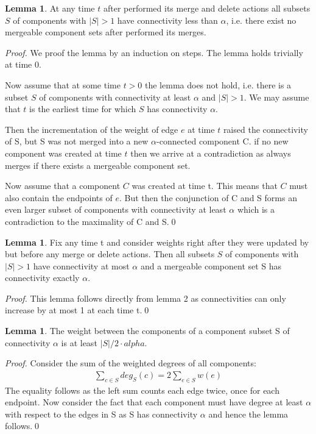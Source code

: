 \documentclass[a4paper,xcolor=dvipsnames, tikz, 12pt]{article}
\newcommand{\crep}{\text{C{\scriptsize REP}}}
\theoremstyle{definition}
\newtheorem{lemma}[defi]{Lemma}
\begin{document}
\begin{lemma}
	At any time $t$ after \crep{} performed its merge and delete actions all subsets $S$ of components with $|S|>1$ have connectivity less than $\alpha$, i.e. there exist no mergeable component sets after \crep{} performed its merges.
\end{lemma}

\textit{Proof.} We proof the lemma by an induction on steps. The lemma holds trivially at time 0.

Now assume that at some time $t>0$ the lemma does not hold, i.e. there is a subset $S$ of components with connectivity at least $\alpha$ and $|S|>1$. We may assume that $t$ is the earliest time for which $S$ has connectivity $\alpha$.

Then the incrementation of the weight of edge $e$ at time $t$ raised the connectivity of S, but S was not merged into a new $\alpha$-connected component C. if no new component was created at time $t$ then we arrive at a contradiction as \crep{} always merges if there exists a mergeable component set.

Now assume that a component $C$ was created at time t. This means that $C$ must also contain the endpoints of $e$. But then the conjunction of C and S forms an even larger subset of components with connectivity at least $\alpha$ which is a contradiction to the maximality of C and S.\qed

\begin{lemma}
	\label{mergeable_lemma}
	Fix any time t and consider weights right after they were updated by \crep{} but before any merge or delete actions. Then all subsets $S$ of components with $|S|>1$ have connectivity at most $\alpha$ and a mergeable component set S has connectivity exactly $\alpha$.
\end{lemma}

\textit{Proof.} This lemma follows directly from lemma 2 as connectivities can only increase by at most 1 at each time t.\qed

\begin{lemma}
	\label{cut_lemma}
	The weight between the components of a component subset S of connectivity $\alpha$ is at least $|S|/2 \cdot alpha$.
\end{lemma}
\textit{Proof.} Consider the sum of the weighted degrees of all components:
\begin{align*}
\sum_{c\in S}deg_S(c)=2\sum_{e\in S}w(e)
\end{align*}
The equality follows as the left sum counts each edge twice, once for each endpoint.
Now consider the fact that each component must have degree at least $\alpha$ with respect to the edges in S as S has connectivity $\alpha$ and hence the lemma follows.\qed
\end{document}
